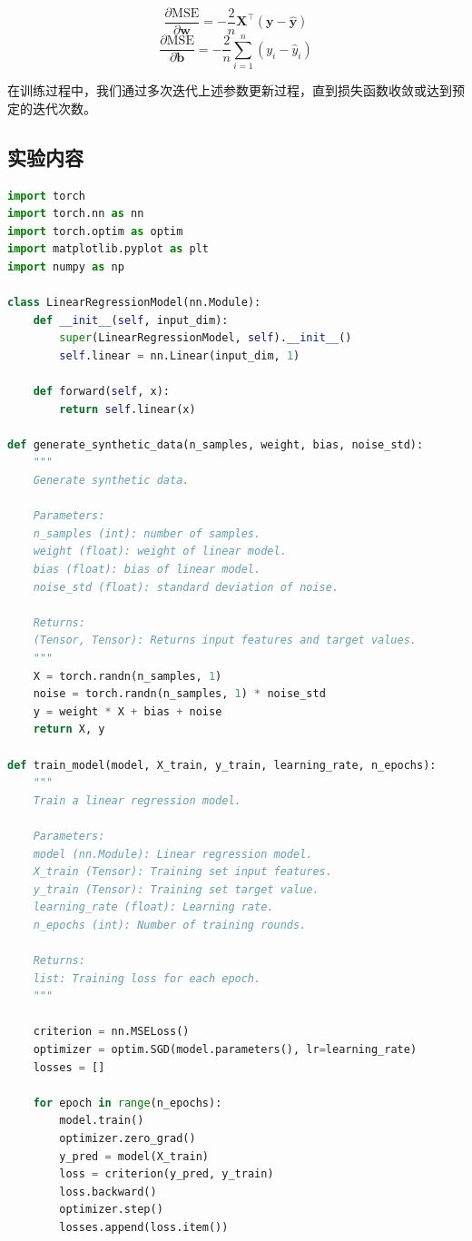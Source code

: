 \documentclass[a4paper,12pt]{article}
\begin{document}
\[
\boxed{
	\frac{\partial \mathrm{MSE}}{\partial \mathbf{w}} = -\frac{2}{n} \mathbf{X}^\top (\mathbf{y} - \hat{\mathbf{y}})
}
\]
\[
\boxed{
	\frac{\partial \mathrm{MSE}}{\partial \mathbf{b}} = -\frac{2}{n} \sum_{i=1}^n (y_i - \hat{y}_i)
}
\]

在训练过程中，我们通过多次迭代上述参数更新过程，直到损失函数收敛或达到预定的迭代次数。

\subsection{实验内容}
\begin{lstlisting}[language=Python, caption=线性回归Python代码]
import torch
import torch.nn as nn
import torch.optim as optim
import matplotlib.pyplot as plt
import numpy as np

class LinearRegressionModel(nn.Module):
	def __init__(self, input_dim):
		super(LinearRegressionModel, self).__init__()
		self.linear = nn.Linear(input_dim, 1)

	def forward(self, x):
		return self.linear(x)

def generate_synthetic_data(n_samples, weight, bias, noise_std):
	"""
	Generate synthetic data.

	Parameters:
	n_samples (int): number of samples.
	weight (float): weight of linear model.
	bias (float): bias of linear model.
	noise_std (float): standard deviation of noise.

	Returns:
	(Tensor, Tensor): Returns input features and target values.
	"""
	X = torch.randn(n_samples, 1)
	noise = torch.randn(n_samples, 1) * noise_std
	y = weight * X + bias + noise
	return X, y

def train_model(model, X_train, y_train, learning_rate, n_epochs):
	"""
	Train a linear regression model.

	Parameters:
	model (nn.Module): Linear regression model.
	X_train (Tensor): Training set input features.
	y_train (Tensor): Training set target value.
	learning_rate (float): Learning rate.
	n_epochs (int): Number of training rounds.

	Returns:
	list: Training loss for each epoch.
	"""
	
	criterion = nn.MSELoss()
	optimizer = optim.SGD(model.parameters(), lr=learning_rate)
	losses = []

	for epoch in range(n_epochs):
		model.train()
		optimizer.zero_grad()
		y_pred = model(X_train)
		loss = criterion(y_pred, y_train)
		loss.backward()
		optimizer.step()
		losses.append(loss.item())


\end{lstlisting}
\end{document}
